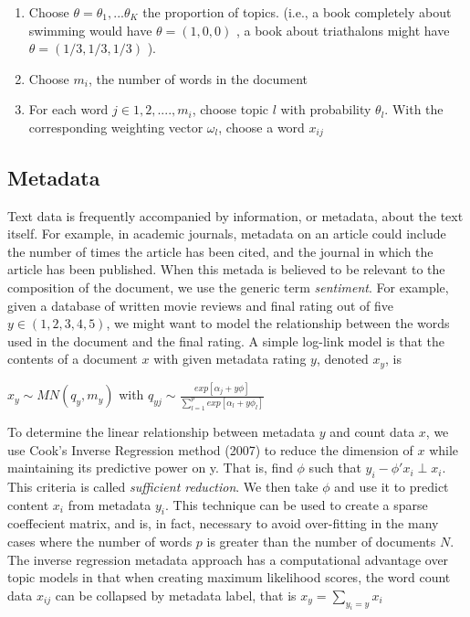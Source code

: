 \documentclass[12pt]{article}
\begin{document}
\begin{enumerate}
\def\labelenumi{\arabic{enumi}.}
\itemsep1pt\parskip0pt
\item
  Choose $\theta = \theta_1,...\theta_K$ the proportion of topics.
  (i.e., a book completely about swimming would have $\theta=(1,0,0)$ ,
  a book about triathalons might have $\theta =(1/3,1/3,1/3)$ ).
\item
  Choose $m_i$, the number of words in the document
\item
  For each word $j \in 1,2,....,m_i$, choose topic $l$ with probability
  $\theta_l$. With the corresponding weighting vector $\omega_l$, choose
  a word $x_{ij}$
\end{enumerate}

\subsection{Metadata}\label{metadata}

Text data is frequently accompanied by information, or metadata, about
the text itself. For example, in academic journals, metadata on an
article could include the number of times the article has been cited,
and the journal in which the article has been published. When this
metada is believed to be relevant to the composition of the document, we
use the generic term \emph{sentiment}. For example, given a database of
written movie reviews and final rating out of five $y \in (1,2,3,4,5)$,
we might want to model the relationship between the words used in the
document and the final rating. A simple log-link model
is that the contents of a document $x$ with given metadata rating $y$,
denoted $x_y$, is

$x_y \sim MN(q_y,m_y)$ with
$q_{yj} \sim \frac{exp[\alpha_j + y \phi]}{\sum_{l=1}^{p} exp[\alpha_l + y \phi_l]}$

To determine the linear relationship between metadata $y$ and count data
$x$, we use Cook's Inverse Regression method (2007) to reduce the
dimension of $x$ while maintaining its predictive power on y. That is,
find $\phi$ such that $y_i - \phi' x_i \perp x_i$. This criteria is
called \emph{sufficient reduction}. We then take $\phi$ and use it to
predict content $x_i$ from metadata $y_i$. This technique can be used to create a sparse coeffecient matrix, and is, in fact, necessary to avoid over-fitting in the many
cases where the number of words $p$ is greater than the number of
documents $N$. The inverse regression metadata approach has a
computational advantage over topic models in that when creating maximum
likelihood scores, the word count data $x_{ij}$ can be collapsed by
metadata label, that is $x_y = \sum_{y_{i} = y}{x_i}$
\end{document}

